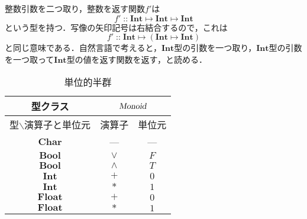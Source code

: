 \documentclass[twocolumn]{jsbook}
\newcommand{\hsklType}[1]{\textbf{#1}}
\newcommand{\hsklTypeclass}[1]{\textsl{#1}}
\newcommand{\hsklBool}{\hsklType{Bool}}
\newcommand{\hsklChar}{\hsklType{Char}}
\newcommand{\hsklInt}{\hsklType{Int}}
\newcommand{\hsklFloat}{\hsklType{Float}}
\newcommand{\hsklMonoid}{\hsklTypeclass{Monoid}}
\DeclareMathOperator{\mathIn}{::}
\DeclareMathOperator{\mathMapsTo}{\mapsto}
\newcommand{\mathMorphII}[3]{#1\mathMapsTo#2\mathMapsTo#3}
\newcommand{\mathMorphIIWithParenthesis}[3]{#1\mathMapsTo(#2\mathMapsTo#3)}
\begin{document}
整数引数を二つ取り，整数を返す関数$f'$は$$f'\mathIn\mathMorphII{\hsklInt}{\hsklInt}{\hsklInt}$$という型を持つ．写像の矢印記号は右結合するので，これは$$f'\mathIn\mathMorphIIWithParenthesis{\hsklInt}{\hsklInt}{\hsklInt}$$と同じ意味である．自然言語で考えると，$\hsklInt$型の引数を一つ取り，$\hsklInt$型の引数を一つ取って$\hsklInt$型の値を返す関数を返す，と読める．

\begin{table}
\caption{単位的半群}
\label{tab:monoids}
\begin{center}
\begin{tabular}{||c||c|c||}
\hline
型クラス
    &\multicolumn{2}{|c||}{$\hsklMonoid$}\\
\hline\hline
型$\backslash$演算子と単位元
    &演算子
    &単位元\\
\hline
$\hsklChar$
    &---
    &---\\
\hline
$\hsklBool$
    &$\vee$
    &$F$\\
\hline
$\hsklBool$
    &$\wedge$
    &$T$\\
\hline
$\hsklInt$
    &$+$
    &$0$\\
\hline
$\hsklInt$
    &$*$
    &$1$\\
\hline
$\hsklFloat$
    &$+$
    &$0$\\
\hline
$\hsklFloat$
    &$*$
    &$1$\\
\hline
\end{tabular}
\end{center}
\end{table}
\end{document}
